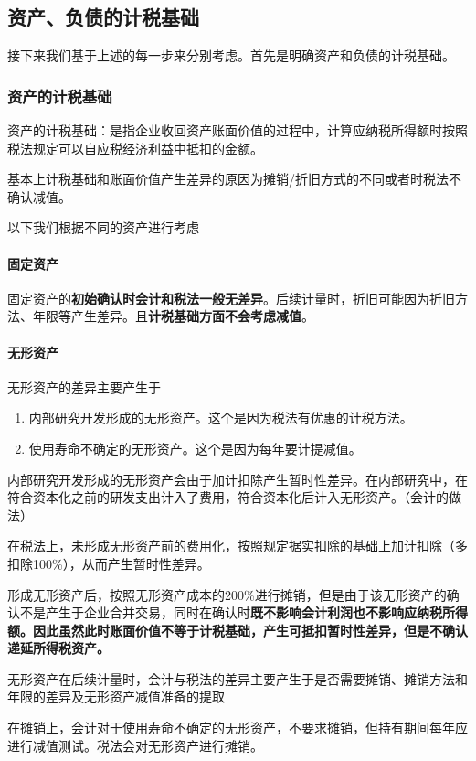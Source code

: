 \documentclass[UTF8,12pt]{ctexart}
\numberwithin{equation}{section} %
\numberwithin{figure}{section}
\numberwithin{table}{section}
\begin{document}
	\subsection{资产、负债的计税基础}
	接下来我们基于上述的每一步来分别考虑。首先是明确资产和负债的计税基础。
	
	\subsubsection{资产的计税基础}
	资产的计税基础：是指企业收回资产账面价值的过程中，计算应纳税所得额时按照税法规定可以自应税经济利益中抵扣的金额。
	
	基本上计税基础和账面价值产生差异的原因为摊销/折旧方式的不同或者时税法不确认减值。
	
	以下我们根据不同的资产进行考虑
	\paragraph{固定资产}
	固定资产的\textbf{初始确认时会计和税法一般无差异}。后续计量时，折旧可能因为折旧方法、年限等产生差异。且\textbf{计税基础方面不会考虑减值}。
	
	\paragraph{无形资产}
	无形资产的差异主要产生于
	\begin{enumerate}
		\item 内部研究开发形成的无形资产。这个是因为税法有优惠的计税方法。
		
		\item 使用寿命不确定的无形资产。这个是因为每年要计提减值。
	\end{enumerate}
	
	内部研究开发形成的无形资产会由于加计扣除产生暂时性差异。在内部研究中，在符合资本化之前的研发支出计入了费用，符合资本化后计入无形资产。（会计的做法）
	
	在税法上，未形成无形资产前的费用化，按照规定据实扣除的基础上加计扣除（多扣除100\%），从而产生暂时性差异。
	
	形成无形资产后，按照无形资产成本的200\%进行摊销，但是由于该无形资产的确认不是产生于企业合并交易，同时在确认时\textbf{既不影响会计利润也不影响应纳税所得额。因此虽然此时账面价值不等于计税基础，产生可抵扣暂时性差异，但是不确认递延所得税资产。}
	
	无形资产在后续计量时，会计与税法的差异主要产生于是否需要摊销、摊销方法和年限的差异及无形资产减值准备的提取
	
	在摊销上，会计对于使用寿命不确定的无形资产，不要求摊销，但持有期间每年应进行减值测试。税法会对无形资产进行摊销。
	
\end{document}
